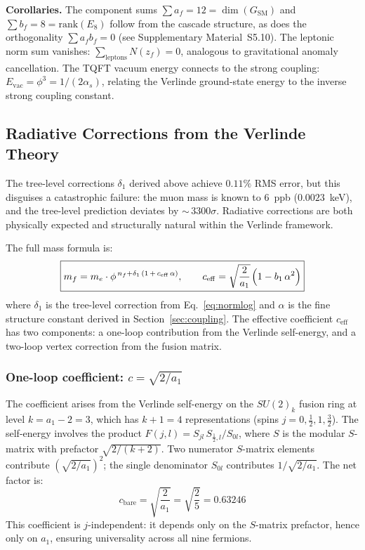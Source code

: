\documentclass[12pt,a4paper]{article}
\theoremstyle{definition}
\begin{document}
\noindent\textbf{Corollaries.}  The component sums $\sum a_f = 12 = \dim(G_{\text{SM}})$ and $\sum b_f = 8 = \mathrm{rank}(E_8)$ follow from the cascade structure, as does the orthogonality $\sum a_f b_f = 0$ (see Supplementary Material~S5.10).  The leptonic norm sum vanishes: $\sum_{\text{leptons}} N(z_f) = 0$, analogous to gravitational anomaly cancellation.  The TQFT vacuum energy connects to the strong coupling: $E_{\text{vac}} = \phi^3 = 1/(2\alpha_s)$, relating the Verlinde ground-state energy to the inverse strong coupling constant.

\subsection{Radiative Corrections from the Verlinde Theory}
\label{sec:oneloop}

The tree-level corrections $\delta_1$ derived above achieve $0.11\%$ RMS error, but this disguises a catastrophic failure: the muon mass is known to $6$~ppb ($0.0023$~keV), and the tree-level prediction deviates by ${\sim}\,3300\sigma$.  Radiative corrections are both physically expected and structurally natural within the Verlinde framework.

The full mass formula is:
\begin{equation}
\boxed{m_f = m_e \cdot \phi^{\,n_f + \delta_1\,(1 \,+\, c_{\mathrm{eff}}\,\alpha)}, \qquad c_{\mathrm{eff}} = \sqrt{\frac{2}{a_1}}\;\!\Bigl(1 - b_1\,\alpha^2\Bigr)}
\label{eq:oneloop}
\end{equation}
where $\delta_1$ is the tree-level correction from Eq.~\eqref{eq:normlog} and $\alpha$ is the fine structure constant derived in Section~\ref{sec:coupling}.  The effective coefficient $c_{\mathrm{eff}}$ has two components: a one-loop contribution from the Verlinde self-energy, and a two-loop vertex correction from the fusion matrix.

\subsubsection*{One-loop coefficient: $c = \sqrt{2/a_1}$}

The coefficient arises from the Verlinde self-energy on the $SU(2)_{k}$ fusion ring at level $k = a_1 - 2 = 3$, which has $k + 1 = 4$ representations (spins $j = 0, \tfrac{1}{2}, 1, \tfrac{3}{2}$).  The self-energy involves the product $F(j,l) = S_{jl}\,S_{\frac{1}{2},l}/S_{0l}$, where $S$ is the modular $S$-matrix with prefactor $\sqrt{2/(k+2)}$.  Two numerator $S$-matrix elements contribute $(\sqrt{2/a_1})^2$; the single denominator $S_{0l}$ contributes $1/\sqrt{2/a_1}$.  The net factor is:
\begin{equation}
c_{\mathrm{bare}} = \sqrt{\frac{2}{a_1}} = \sqrt{\frac{2}{5}} = 0.63246
\label{eq:cqed}
\end{equation}
This coefficient is $j$-independent: it depends only on the $S$-matrix prefactor, hence only on $a_1$, ensuring universality across all nine fermions.
\end{document}
